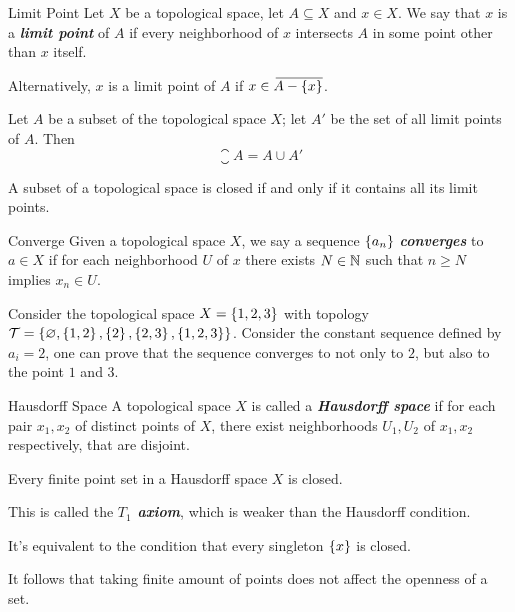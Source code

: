 \documentclass[12pt,a4paper]{article}
\begin{document}
    \begin{defi}{Limit Point}
        Let $X$ be a topological space, let $A\subseteq X$ and $x\in X$. We say that $x$ is a \textbf{\textit{limit point}} of $A$ if every neighborhood of $x$ intersects $A$ in some point other than $x$ itself.
    \end{defi}
    \begin{remark}
        Alternatively, $x$ is a limit point of $A$ if $x\in{}\mkern3mu\overline{\mkern-3muA-\left\{x\right\}}$.
    \end{remark}
    \hfill

    \begin{thm}
        Let $A$ be a subset of the topological space $X$; let $A'$ be the set of all limit points of $A$. Then
        $$
        \closure{A}=A\cup A'
        $$
    \end{thm}
    \begin{cor}
        A subset of a topological space is closed if and only if it contains all its limit points.
    \end{cor}
    \hfill

    \begin{defi}{Converge}
        Given a topological space $X$, we say a sequence $\left\{a_n\right\}$ \textbf{\textit{converges}} to $a\in X$ if for each neighborhood $U$ of $x$ there exists $N\in\mathbb{N}$ such that $n\geq N$ implies $x_n\in U$.
    \end{defi}
    \begin{eg}
        Consider the topological space $X=\left\{1,2,3\right\}$ with topology $\mathcal{T}=\left\{\varnothing,\left\{1,2\right\},\left\{2\right\},\left\{2,3\right\},\left\{1,2,3\right\}\right\}$. Consider the constant sequence defined by $a_i=2$, one can prove that the sequence converges to not only to $2$, but also to the point $1$ and $3$.
    \end{eg}
    \hfill

    \begin{defi}{Hausdorff Space}
        A topological space $X$ is called a \textbf{\textit{Hausdorff space}} if for each pair $x_1,x_2$ of distinct points of $X$, there exist neighborhoods $U_1, U_2$ of $x_1,x_2$ respectively, that are disjoint.
    \end{defi}
    \hfill

    \begin{thm}
        Every finite point set in a Hausdorff space $X$ is closed.
    \end{thm}
    \begin{remark}
        This is called the \textit{\textbf{$T_1$ axiom}}, which is weaker than the Hausdorff condition.
    \end{remark}
    \begin{remark}
        It's equivalent to the condition that every singleton $\left\{x\right\}$ is closed.
    \end{remark}
    \begin{remark}
        It follows that taking finite amount of points does not affect the openness of a set.
    \end{remark}
    \hfill
\end{document}
